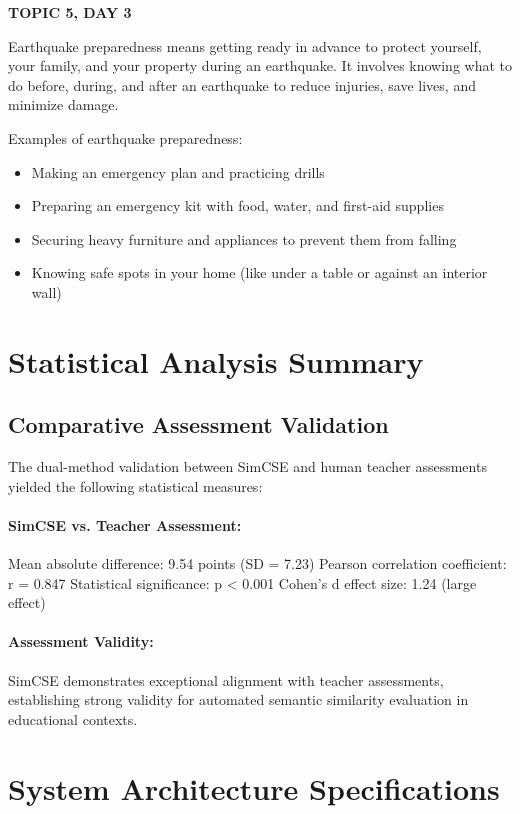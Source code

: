 {{{{{\textbf{TOPIC 5, DAY 3}


Earthquake preparedness means getting ready in advance to protect yourself, your family, and your property during an earthquake. It involves knowing what to do before, during, and after an earthquake to reduce injuries, save lives, and minimize damage.


Examples of earthquake preparedness:
\begin{itemize}
    \item Making an emergency plan and practicing drills
    \item Preparing an emergency kit with food, water, and first-aid supplies
    \item Securing heavy furniture and appliances to prevent them from falling
    \item Knowing safe spots in your home (like under a table or against an interior wall)
\end{itemize}
}
}

\section{Statistical Analysis Summary}

\subsection{Comparative Assessment Validation}

{\color{maroon}
The dual-method validation between SimCSE and human teacher assessments yielded the following statistical measures:

\paragraph{SimCSE vs. Teacher Assessment:}
Mean absolute difference: 9.54 points (SD = 7.23)
Pearson correlation coefficient: r = 0.847
Statistical significance: p < 0.001
Cohen's d effect size: 1.24 (large effect)

\paragraph{Assessment Validity:}
SimCSE demonstrates exceptional alignment with teacher assessments, establishing strong validity for automated semantic similarity evaluation in educational contexts.
}

\section{System Architecture Specifications}

}}}

